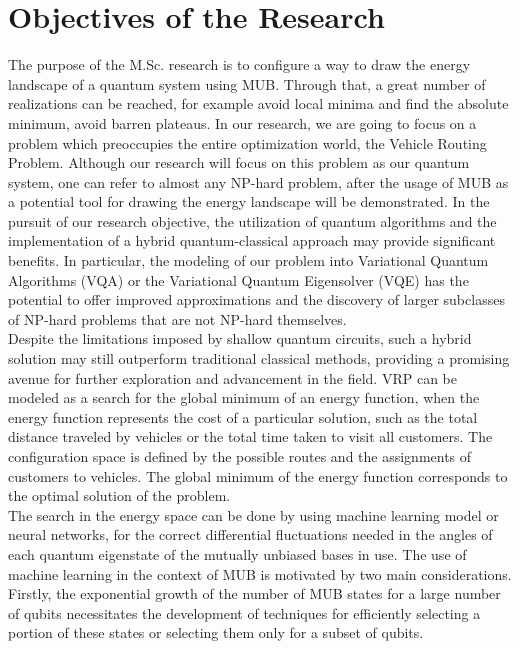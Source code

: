 \documentclass[12pt, a4paper]{article}
\begin{document}
    \section{Objectives of the Research}\label{sec:objectives-of-the-research}
    The purpose of the M.Sc. research is to configure a way to draw the energy landscape of a quantum system using MUB.
    Through that, a great number of realizations can be reached, for example avoid local minima and find the absolute minimum, avoid barren plateaus\@.
    In our research, we are going to focus on a problem which preoccupies the entire optimization world, the Vehicle Routing Problem.
    Although our research will focus on this problem as our quantum system, one can refer to almost any NP-hard problem, after the usage of MUB as
    a potential tool for drawing the energy landscape will be demonstrated.
    In the pursuit of our research objective, the utilization of quantum algorithms and the implementation of a hybrid
    quantum-classical approach may provide significant benefits.
    In particular, the modeling of our problem into
    Variational Quantum Algorithms (VQA) or the Variational Quantum Eigensolver (VQE) has the potential to offer
    improved approximations and the discovery of larger subclasses of NP-hard problems that are not NP-hard themselves.\\
    Despite the limitations imposed by shallow quantum circuits, such a hybrid solution may still outperform traditional
    classical methods, providing a promising avenue for further exploration and advancement in the field.
    VRP can be modeled as a search for the global minimum of an energy function, when the energy function represents
    the cost of a particular solution, such as the total distance traveled by vehicles or the total time taken to visit
    all customers.
    The configuration space is defined by the possible routes and the assignments of customers to vehicles.
    The global minimum of the energy function corresponds to the optimal solution of the problem\@.\\
    The search in the energy space can be done by using machine learning model or neural networks, for the correct differential
    fluctuations needed in the angles of each quantum eigenstate of the mutually unbiased bases in use.
    The use of machine learning in the context of MUB is motivated by two main considerations.
    Firstly, the exponential growth of the number of MUB states for a large number of qubits necessitates the development
    of techniques for efficiently selecting a portion of these states or selecting them only for a subset of qubits.
\end{document}
